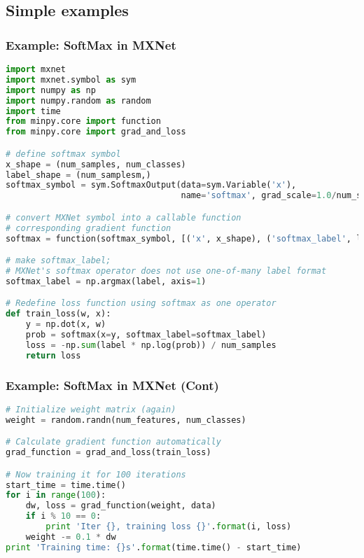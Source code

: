 \subsection{Simple examples}

\begin{frame}[fragile]
  \MyLogo
  \frametitle{Example: SoftMax in MXNet}  

\begin{lstlisting}[language=python]
import mxnet
import mxnet.symbol as sym
import numpy as np
import numpy.random as random
import time
from minpy.core import function
from minpy.core import grad_and_loss

# define softmax symbol
x_shape = (num_samples, num_classes)
label_shape = (num_samplesm,)
softmax_symbol = sym.SoftmaxOutput(data=sym.Variable('x'), 
                                   name='softmax', grad_scale=1.0/num_samples)

# convert MXNet symbol into a callable function 
# corresponding gradient function
softmax = function(softmax_symbol, [('x', x_shape), ('softmax_label', label_shape)])

# make softmax_label; 
# MXNet's softmax operator does not use one-of-many label format
softmax_label = np.argmax(label, axis=1)

# Redefine loss function using softmax as one operator
def train_loss(w, x):
    y = np.dot(x, w)
    prob = softmax(x=y, softmax_label=softmax_label)
    loss = -np.sum(label * np.log(prob)) / num_samples
    return loss
\end{lstlisting}

\end{frame}

\begin{frame}[fragile]
  \MyLogo
  \frametitle{Example: SoftMax in MXNet (Cont)}  

\ContinueLineNumber
\scriptsize{
\begin{lstlisting}[language=python]
# Initialize weight matrix (again)
weight = random.randn(num_features, num_classes)

# Calculate gradient function automatically
grad_function = grad_and_loss(train_loss)

# Now training it for 100 iterations
start_time = time.time()
for i in range(100):
    dw, loss = grad_function(weight, data)
    if i % 10 == 0:
        print 'Iter {}, training loss {}'.format(i, loss)
    weight -= 0.1 * dw
print 'Training time: {}s'.format(time.time() - start_time)
\end{lstlisting}
}

\vskip 100pt

\end{frame}